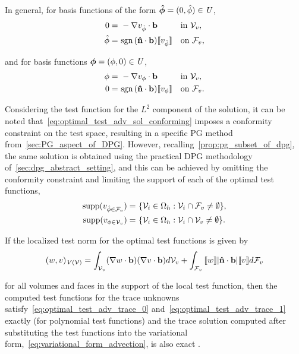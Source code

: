 In general, for basis functions of the form $\mathit{\bm{{\hat{\phi}}}} = (0,\hat{\phi}) \in \mathit{{{U}}}$,
\begin{align}
0 =\ & -\nabla v_{\hat{\phi}} \cdot \vect{b} && \text{in}\ \fe{V}_v, \label{eq:optimal_test_adv_trace_0} \\
\hat{\phi} =\ & \sign{\vect{\hat{n}} \cdot \vect{b}} \jump{v_{\hat{\phi}}} && \text{on}\ \fe{F}_v,
\label{eq:optimal_test_adv_trace_1}
\end{align}

and for basis functions $\mathit{\bm{{\phi}}} = (\phi,0) \in \mathit{{{U}}}$,
\begin{align}
\phi =\ & -\nabla v_{\phi} \cdot \vect{b} && \text{in}\ \fe{V}_v, \label{eq:optimal_test_adv_sol} \\
0 =\ & \sign{\vect{\hat{n}} \cdot \vect{b}} \jump{v_{\phi}} && \text{on}\ \fe{F}_v.
\label{eq:optimal_test_adv_sol_conforming}
\end{align}

Considering the test function for the $L^2$ component of the solution, it can be noted
that~\eqref{eq:optimal_test_adv_sol_conforming} imposes a conformity constraint on the test space, resulting in a
specific PG method from~\autoref{sec:PG_aspect_of_DPG}. However, recalling~\autoref{prop:pg_subset_of_dpg}, the same
solution is obtained using the practical DPG methodology of~\autoref{sec:dpg_abstract_setting}, and this can be achieved
by omitting the conformity constraint and limiting the support of each of the optimal test functions,
\begin{align}
{\text{supp}(v_{\hat{\phi} \in \mathcal{{{F}}}_v})} =\ & \{ \mathcal{{{V}}}_i \in \Omega_h : \mathcal{{{V}}}_i \cap \mathcal{{{F}}}_v \ne \emptyset \}, \\
{\text{supp}(v_{\phi \in \mathcal{{{V}}}_v})} =\ & \{ \mathcal{{{V}}}_i \in \Omega_h : \mathcal{{{V}}}_i \cap \mathcal{{{V}}}_v \ne \emptyset \}.
\end{align}

\begin{proposition}
If the localized test norm for the optimal test functions is given by 
\begin{align}
(w,v)_{\fspace{V}(\fe{V})}
= 
\int_{\fe{V}_v} (\nabla w \cdot \vect{b})(\nabla v \cdot \vect{b}) d\fe{V}_v
+
\int_{\fe{F}_v} \jump{w} |\vect{\hat{n}} \cdot \vect{b}| \jump{v} d\fe{F}_v
\end{align}

for all volumes and faces in the support of the local test function, then the computed test functions for the trace
unknowns satisfy~\eqref{eq:optimal_test_adv_trace_0} and~\eqref{eq:optimal_test_adv_trace_1} exactly (for polynomial
test functions) and the trace solution computed after substituting the test functions into the variational
form,~\eqref{eq:variational_form_advection}, is also exact .

\end{proposition}

